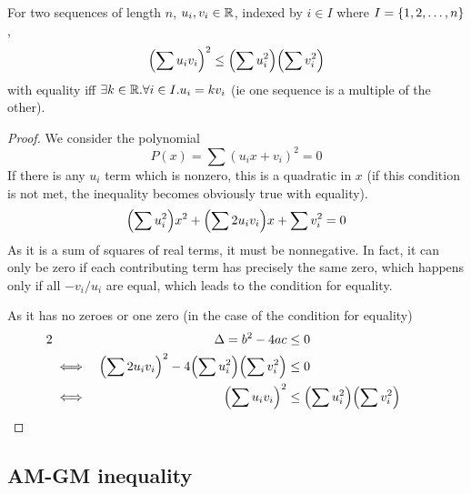 \begin{theorem}
For two sequences of length \(n\), \(u_i, v_i \in \mathbb R\), indexed by
\(i \in I\) where \(I = \{1, 2, \dotsc, n\}\),
\begin{equation*}
\pqty{\sum u_i v_i}^2 \le \pqty{\sum u_i^2} \pqty{\sum v_i^2}
\end{equation*}
with equality iff \(\exists k \in \mathbb R. \forall i \in I. u_i = k v_i\) (ie one
sequence is a multiple of the other).
\end{theorem}
\begin{proof}
We consider the polynomial
\begin{equation*}
P(x) = \sum (u_i x + v_i)^2 = 0
\end{equation*}
If there is any \(u_i\) term which is nonzero, this is a quadratic in \(x\)
(if this condition is not met, the inequality becomes obviously true with
equality).
\begin{equation*}
\pqty{\sum u_i^2} x^2 + \pqty{\sum 2 u_i v_i} x + \sum v_i^2 = 0
\end{equation*}
As it is a sum of squares of real terms, it must be nonnegative. In fact, it
can only be zero if each contributing term has precisely the same zero,
which happens only if all \(-v_i/u_i\) are equal, which leads to the
condition for equality.

As it has no zeroes or one zero (in the case of the condition for equality)
\begin{alignat*}2
&&\Delta = b^2 - 4ac &\le 0 \\
&\iff&
\pqty{\sum 2 u_i v_i}^2 - 4\pqty{\sum u_i^2}\pqty{\sum v_i^2} &\le 0 \\
&\iff& \pqty{\sum u_i v_i}^2 &\le \pqty{\sum u_i^2} \pqty{\sum v_i^2}
    \tag*{\qedhere}
\end{alignat*}
\end{proof}

\subsection{AM-GM inequality}

